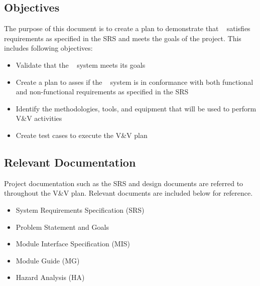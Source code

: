 \documentclass[12pt, titlepage]{article}
\begin{document}
\subsection{Objectives}

  
The purpose of this document is to create a plan to demonstrate that \progname~ satisfies requirements as specified in the SRS and meets the goals of the project. This includes following objectives:
  
\begin{itemize}
  \item Validate that the \progname~ system meets its goals
  \item Create a plan to asses if the \progname~ system is in conformance with both functional and non-functional requirements as specified in the SRS
  \item Identify the methodologies, tools, and equipment that will be used to perform V\&V activities
  \item Create test cases to execute the V\&V plan
\end{itemize}

\subsection{Relevant Documentation}

  
Project documentation such as the SRS and design documents are referred to throughout the V\&V plan. Relevant documents are included below for reference.

\begin{itemize}
	\item System Requirements Specification (SRS) \cite{SRS}
	\item Problem Statement and Goals \cite{PSG}
	\item Module Interface Specification (MIS) \cite{MIS}
	\item Module Guide (MG) \cite{MG}
	\item Hazard Analysis (HA) \cite{FMEA}
\end{itemize}
\end{document}
